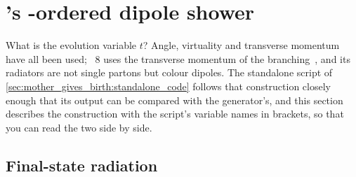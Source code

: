\section{\PYTHIA's \texorpdfstring{\pt}{pT}-ordered dipole shower}
\label{sec:mother_gives_birth:dipole_shower}

What is the evolution variable $t$? Angle, virtuality and transverse
momentum have all been used; \PYTHIA~8 uses the transverse momentum of the
branching~\cite{Sjostrand:2004ef,Bierlich:2022pfr}, and its radiators are
not single partons but colour dipoles. The standalone script of
\cref{sec:mother_gives_birth:standalone_code} follows that construction
closely enough that its output can be compared with the generator's, and
this section describes the construction with the script's variable names in
brackets, so that you can read the two side by side.

\subsection{Final-state radiation}
\label{sec:mother_gives_birth:fsr}

